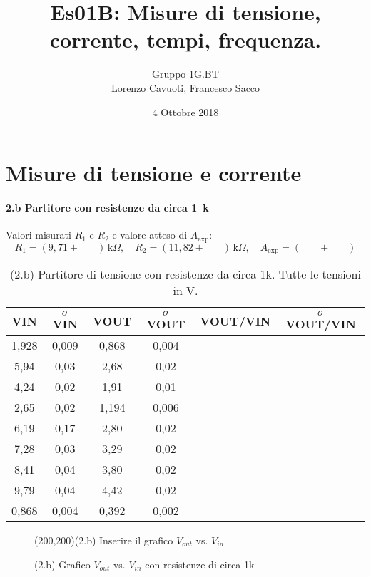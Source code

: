 \documentclass[10pt,a4paper]{article}
\author{Gruppo 1G.BT \\ Lorenzo Cavuoti, Francesco Sacco}
\title{Es01B: Misure di tensione, corrente, tempi, frequenza.}
\newcommand{\exn}{\phantom{xxx}}
\begin{document}
\date{4 Ottobre 2018}
\maketitle

\setcounter{section}{1}
\section{Misure di tensione e corrente}

\paragraph{2.b Partitore con resistenze da circa 1~k}
Valori misurati $R_1$ e $R_2$ e valore atteso di $A_\mathrm{exp}$:
\[
R_1 = ( 9,71 \pm \exn ) \,\mathrm{k}\Omega, \quad
R_2 = ( 11,82 \pm \exn ) \,\mathrm{k}\Omega, \quad
A_\mathrm{exp} = ( \exn \pm \exn ) 
\]


\begin{table}[h]
\centering
\begin{tabular}{|c|c|c|c|c|c|}
\hline 
VIN& $\sigma$ VIN  &VOUT	 & $\sigma$ VOUT& VOUT/VIN & $\sigma$ VOUT/VIN \\
\hline 
1,928 & 0,009 & 0,868 & 0,004 & \exn &\exn \\
5,94 & 0,03 & 2,68 & 0,02 & \exn &\exn \\
4,24 & 0,02 & 1,91 & 0,01 & \exn &\exn \\
2,65 & 0,02 & 1,194 & 0,006 & \exn &\exn \\
6,19 & 0,17 & 2,80 & 0,02 & \exn &\exn \\
7,28 & 0,03 & 3,29 & 0,02 & \exn &\exn \\
8,41 & 0,04 & 3,80 & 0,02 & \exn &\exn \\
9,79 & 0,04 & 4,42 & 0,02 & \exn &\exn \\
0,868 & 0,004 & 0,392 & 0,002 & \exn &\exn \\
\hline 
\end{tabular} 
\caption{(2.b) Partitore di tensione con resistenze da circa 1k. Tutte le tensioni in V.\label{t:par1}}
\end{table}


\begin{figure}[h]
\centering
\framebox(200,200){(2.b) Inserire il grafico $V_{out}$ vs. $V_{in}$ }

\caption{(2.b) Grafico $V_{out}$ vs. $V_{in}$ con resistenze di circa 1k \label{f:par1}}
\end{figure}
\end{document}
